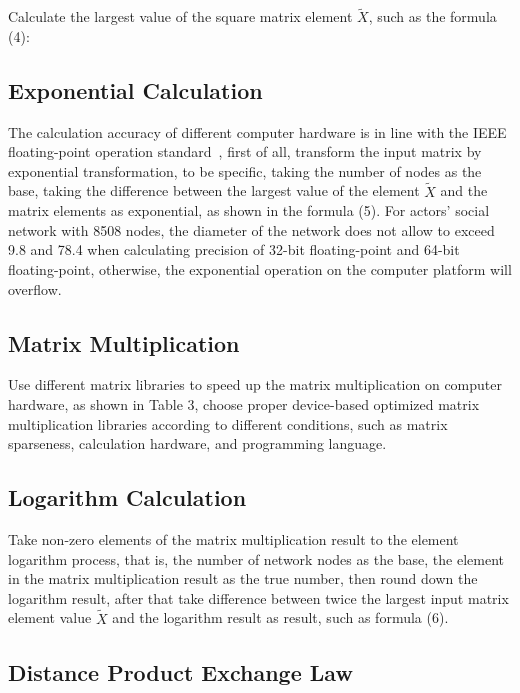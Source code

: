 \documentclass[review]{cvpr}
\begin{document}
Calculate the largest value of the square matrix element $\widetilde X$, such as the formula (4):

\subsection{Exponential Calculation}

The calculation accuracy of different computer hardware is in line with the IEEE floating-point operation standard~\cite{ieee1985ieee},
first of all, transform the input matrix by exponential transformation, to be specific, taking the number of nodes as the base,
taking the difference between the largest value of the element $\widetilde X$ and the matrix elements as exponential, as shown in the formula (5).
\eg For actors' social network with 8508 nodes, the diameter of the network does not allow to exceed 9.8 and 78.4 when calculating precision of 32-bit floating-point and 64-bit floating-point,
otherwise, the exponential operation on the computer platform will overflow.

\subsection{Matrix Multiplication}
Use different matrix libraries to speed up the matrix multiplication on computer hardware, as shown in Table 3, choose proper device-based optimized matrix multiplication libraries according to different conditions, such as matrix sparseness, calculation hardware, and programming language.

\subsection{Logarithm Calculation}
Take non-zero elements of the matrix multiplication result to the element logarithm process, that is, the number of network nodes as the base, the element in the matrix multiplication result as the true number, then round down the logarithm result,
after that take difference between twice the largest input matrix element value $\widetilde X$ and the logarithm result as result, such as formula (6).

\subsection{Distance Product Exchange Law}
\end{document}
